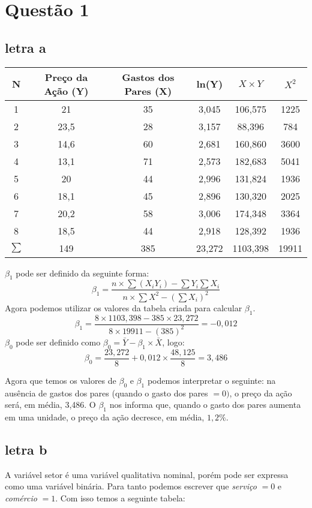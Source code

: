\chapter{Questão 1}
\section*{letra a}
\begin{center}
    \begin{tabular}{|c|c|c|c|c|c|}
        \hline
        N & Preço da Ação (Y) & Gastos dos Pares (X) & ln(Y) & \(X \times Y\) & \(X^2\)  \\ \hline
        1 & 21 & 35 & 3,045 & 106,575 & 1225\\ \hline
        2 & 23,5 & 28 & 3,157 & 88,396 & 784\\ \hline
        3 & 14,6 & 60 & 2,681 & 160,860 & 3600\\ \hline
        4 & 13,1 & 71 & 2,573 & 182,683 & 5041\\ \hline
        5 & 20 & 44 & 2,996 & 131,824 & 1936\\ \hline
        6 & 18,1 & 45 & 2,896 & 130,320 & 2025\\ \hline
        7 & 20,2 & 58 & 3,006 & 174,348 & 3364\\ \hline
        8 & 18,5 & 44 & 2,918 & 128,392 & 1936\\ \hline
        \(\sum\) & 149 & 385 & 23,272 & 1103,398 & 19911\\ \hline
    \end{tabular}
\end{center}
\(\beta_{1}\) pode ser definido da seguinte forma:
\[\beta_{1} = \frac{n \times \sum (X_{i}Y_{i}) - \sum Y_{i}\sum X_{i}}{n \times \sum X^2 - (\sum X_{i})^2}\]
Agora podemos utilizar os valores da tabela criada para calcular \(\beta_{1}\).
\[ \beta_{1} = \frac{8 \times 1103,398 - 385 \times 23,272}{8 \times 19911 - (385)^2} = -0,012 \]
\(\beta_{0}\) pode ser definido como \(\beta_{0} = \bar{Y} - \beta_{1} \times \bar{X}\), logo:
\[ \beta_{0} = \frac{23,272}{8} + 0,012 \times \frac{48,125}{8} = 3,486 \]

Agora que temos os valores de \(\beta_{0}\) e \(\beta_{1}\) podemos interpretar o seguinte: na ausência de gastos dos pares (quando o gasto dos pares \(= 0)\), o preço da ação será, em média, 3,486. O \(\beta_{1}\) nos informa que, quando o gasto dos pares aumenta em uma unidade, o preço da ação decresce, em média, \(1,2\%\).
\section*{letra b}
A variável setor é uma variável qualitativa nominal, porém pode ser expressa como uma variável binária. Para tanto podemos escrever que \textit{serviço} \(= 0\) e \textit{comércio} \(= 1\). Com isso temos a seguinte tabela:

